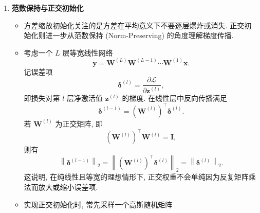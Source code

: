\documentclass{../nndlcourse}
\begin{document}
\begin{enumerate}
\begin{itemize}
\[        =
        \sqrt{\frac{6}{n_{\mathrm{in}}+n_{\mathrm{out}}}}.
      \]
      Xavier 初始化主要适合 Tanh 等在零附近近似线性的平滑激活函数. 更一般地, 若非线性在初始化附近可近似为 $f(z)\approx c z$, 则前面的方差推导只会多出一个常数因子 $c^2$, 可以通过额外的增益系数进行修正. Sigmoid 本身不是零中心函数, 但在零附近有 $\sigma(z)-1/2\approx z/4$, 因而也可以用类似的局部线性近似来理解; 只是它的非零均值和饱和区会使深层网络训练更容易出现偏移和梯度变小的问题.
      \item 对于 ReLU 及其变体, 由于大约一半负半轴输出被置零, He 初始化常令
      \[
        \operatorname{Var}(W_{ij}) \approx \frac{2}{n_{\mathrm{in}}}.
      \]
      这可以更好地保持前向信号和反向梯度的尺度.
      \item 需要注意, 初始化公式依赖激活函数、层类型和实现约定. 在卷积层中, $n_{\mathrm{in}}$ 通常等于输入通道数乘以卷积核面积. 因此, 固定使用 $\mathcal{N}(0,0.01^2)$ 这样的经验常数并不总是合理.
    \end{itemize}
  \item \textbf{范数保持与正交初始化}
    \begin{itemize}
      \item 方差缩放初始化关注的是方差在平均意义下不要逐层爆炸或消失. 正交初始化则进一步从范数保持 (Norm-Preserving) 的角度理解梯度传播.
      \item 考虑一个 $L$ 层等宽线性网络
      \[
        \boldsymbol{y}
        =
        \boldsymbol{W}^{(L)}
        \boldsymbol{W}^{(L-1)}
        \cdots
        \boldsymbol{W}^{(1)}
        \boldsymbol{x}.
      \]
      记误差项
      \[
        \boldsymbol{\delta}^{(l)}
        =
        \frac{\partial \mathcal{L}}{\partial \boldsymbol{z}^{(l)}},
      \]
      即损失对第 $l$ 层净激活值 $\boldsymbol{z}^{(l)}$ 的梯度. 在线性层中反向传播满足
      \[
        \boldsymbol{\delta}^{(l-1)}
        =
        {\left(\boldsymbol{W}^{(l)}\right)}^{\top}
        \boldsymbol{\delta}^{(l)}.
      \]
      若 $\boldsymbol{W}^{(l)}$ 为正交矩阵, 即
      \[
        {\left(\boldsymbol{W}^{(l)}\right)}^{\top}
        \boldsymbol{W}^{(l)}
        =
        \boldsymbol{I},
      \]
      则有
      \[
        \left\|\boldsymbol{\delta}^{(l-1)}\right\|_2
        =
        \left\|
        {\left(\boldsymbol{W}^{(l)}\right)}^{\top}
        \boldsymbol{\delta}^{(l)}
        \right\|_2
        =
        \left\|\boldsymbol{\delta}^{(l)}\right\|_2.
      \]
      这说明, 在纯线性且等宽的理想情形下, 正交权重不会单纯因为反复矩阵乘法而放大或缩小误差项.
      \item 实现正交初始化时, 常先采样一个高斯随机矩阵

\end{itemize}
\end{enumerate}
\end{document}
